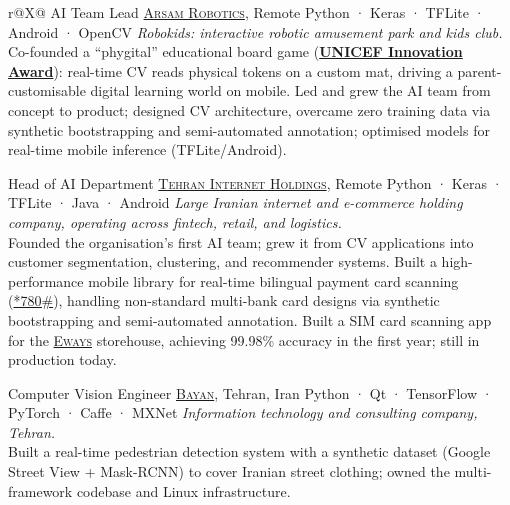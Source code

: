 \begin{xltabular}{\textwidth}{r@{}X@{}}
  {AI Team Lead}
  {\href{http://www.arsamrobotics.com/en/index}{\textsc{Arsam Robotics}}, Remote}
  {Python · Keras · TFLite · Android · OpenCV}
  {\small\textit{Robokids: interactive robotic amusement park and kids club.}\\[1mm]
    \tabitem Co-founded a ``phygital'' educational board game (\href{https://www.unicef.org/iran/en/press-releases/unicef-and-vice-presidency-science-and-technology-hold-national-innovations-award}{\textbf{UNICEF Innovation Award}}): real-time CV reads physical tokens on a custom mat, driving a parent-customisable digital learning world on mobile.
    \tabitem Led and grew the AI team from concept to product; designed CV architecture, overcame zero training data via synthetic bootstrapping and semi-automated annotation; optimised models for real-time mobile inference (TFLite/Android).%
  }

  {Head of AI Department}
  {\href{https://www.linkedin.com/company/tehran-internet}{\textsc{Tehran Internet Holdings}}, Remote}
  {Python · Keras · TFLite · Java · Android}
  {\small\textit{Large Iranian internet and e-commerce holding company, operating across fintech, retail, and logistics.}\\[1mm]
    \tabitem Founded the organisation's first AI team; grew it from CV applications into customer segmentation, clustering, and recommender systems.
    \tabitem Built a high-performance mobile library for real-time bilingual payment card scanning (\href{https://780.ir/}{*780\#}), handling non-standard multi-bank card designs via synthetic bootstrapping and semi-automated annotation.
    \tabitem Built a SIM card scanning app for the \href{https://www.eways.co/}{\textsc{Eways}} storehouse, achieving 99.98\% accuracy in the first year; still in production today.%
  }

  {Computer Vision Engineer}
  {\href{https://vision.bayan.ir}{\textsc{Bayan}}, Tehran, Iran}
  {Python · Qt · TensorFlow · PyTorch · Caffe · MXNet}
  {\small\textit{Information technology and consulting company, Tehran.}\\[1mm]
    \tabitem Built a real-time pedestrian detection system with a synthetic dataset (Google Street View + Mask-RCNN) to cover Iranian street clothing; owned the multi-framework codebase and Linux infrastructure.%
  }


\end{xltabular}
